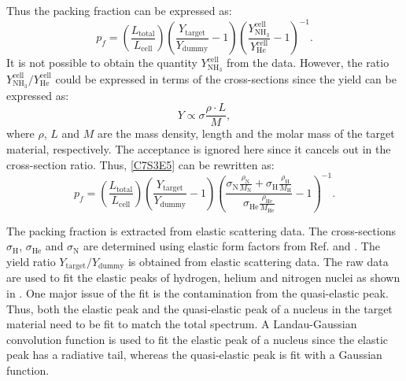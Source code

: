 Thus the packing fraction can be expressed as:
\begin{equation} \label{C7S3E5}
p_f = \left(\frac{L_{\mathrm{total}}}{L_{\mathrm{cell}}}\right)\left(\frac{Y_{\mathrm{target}}}{Y_{\mathrm{dummy}}}-1\right)\left(\frac{Y_{\mathrm{NH_3}}^{\mathrm{cell}}}{Y_{\mathrm{He}}^{\mathrm{cell}}}-1\right)^{-1}.
\end{equation}
It is not possible to obtain the quantity $Y_{\mathrm{NH_3}}^{\mathrm{cell}}$ from the data. However, the ratio $Y_{\mathrm{NH_3}}^{\mathrm{cell}}/Y_{\mathrm{He}}^{\mathrm{cell}}$ could be expressed in terms of the cross-sections since the yield can be expressed as:
\begin{equation} \label{C7S3E6}
Y \propto \sigma\frac{\rho\cdot L}{M},
\end{equation}
where $\rho$, $L$ and $M$ are the mass density, length and the molar mass of the target material, respectively. The acceptance is ignored here since it cancels out in the cross-section ratio. Thus, \cref{C7S3E5} can be rewritten as:
\begin{equation} \label{C7S3E7}
p_f = \left(\frac{L_{\mathrm{total}}}{L_{\mathrm{cell}}}\right)\left(\frac{Y_{\mathrm{target}}}{Y_{\mathrm{dummy}}}-1\right)\left(\frac{\sigma_{\mathrm{N}}\frac{\rho_{\mathrm{N}}}{M_{\mathrm{N}}}+\sigma_{\mathrm{H}}\frac{\rho_{\mathrm{H}}}{M_{\mathrm{H}}}}{\sigma_{\mathrm{He}}\frac{\rho_{\mathrm{He}}}{M_{\mathrm{He}}}}-1\right)^{-1}.
\end{equation}

The packing fraction is extracted from elastic scattering data. The cross-sections $\sigma_{\mathrm{H}}$, $\sigma_{\mathrm{He}}$ and $\sigma_{\mathrm{N}}$ are determined using elastic form factors from Ref. \cite{Venkat2011} and \cite{Jager1974}. The yield ratio $Y_{\mathrm{target}}/Y_{\mathrm{dummy}}$ is obtained from elastic scattering data. The raw data are used to fit the elastic peaks of hydrogen, helium and nitrogen nuclei as shown in . One major issue of the fit is the contamination from the quasi-elastic peak. Thus, both the elastic peak and the quasi-elastic peak of a nucleus in the target material need to be fit to match the total spectrum. A Landau-Gaussian convolution function is used to fit the elastic peak of a nucleus since the elastic peak has a radiative tail, whereas the quasi-elastic peak is fit with a Gaussian function.

